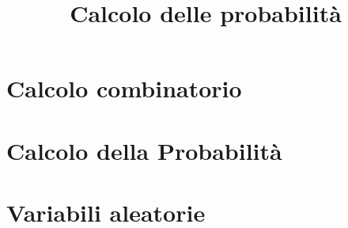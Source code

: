 \documentclass[draft]{lecturenotes}
\begin{document}
\title{Calcolo delle probabilit\`a}

\maketitle

\newpage

\tableofcontents
\newpage

\chapter{Calcolo combinatorio}



\newpage

\chapter{Calcolo della Probabilit\`a}



\newpage

\chapter{Variabili aleatorie}



\newpage


%
\end{document}
